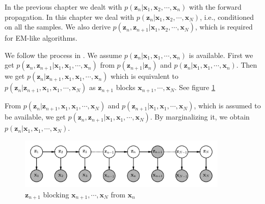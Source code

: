 \documentclass[a4]{article}
\begin{document}
In the previous chapter we dealt with $p(\bm{z}_n | \bm{x}_1, \bm{x}_2, \cdots, \bm{x}_n)$ with the forward propagation.
In this chapter we deal with $p(\bm{z}_n | \bm{x}_1, \bm{x}_2, \cdots, \bm{x}_N)$, i.e., conditioned on all the
samples. We also derive $p(\bm{z}_n, \bm{z}_{n+1} | \bm{x}_1, \bm{x}_2, \cdots, \bm{x}_N)$, which is required
for EM-like algorithms.

We follow the process in \cite{sarkka2011}. We assume $p(\bm{z}_n | \bm{x}_1, \bm{x}_1, \cdots, \bm{x}_n)$ is available.
First we get $p(\bm{z}_n, \bm{z}_{n+1} | \bm{x}_1, \bm{x}_1, \cdots, \bm{x}_n)$ from
$p(\bm{z}_{n+1} |\bm{z}_{n})$
and
$p(\bm{z}_n | \bm{x}_1, \bm{x}_1, \cdots, \bm{x}_n)$.
Then we get $p(\bm{z}_n | \bm{z}_{n+1},  \bm{x}_1, \bm{x}_1, \cdots, \bm{x}_n)$ which is equivalent to
$p(\bm{z}_n | \bm{z}_{n+1},  \bm{x}_1, \bm{x}_1, \cdots, \bm{x}_N)$ as $\bm{z}_{n+1}$ blocks
$\bm{x}_{n+1}, \cdots, \bm{x}_N$. See figure \ref{fig:chain_n_plus_1_block}

From $p(\bm{z}_n | \bm{z}_{n+1},  \bm{x}_1, \bm{x}_1, \cdots, \bm{x}_N)$ and 
$p(\bm{z}_{n+1} | \bm{x}_1, \bm{x}_1, \cdots, \bm{x}_N)$, which is assumed to be available, we get
$p(\bm{z}_n, \bm{z}_{n+1} | \bm{x}_1, \bm{x}_1, \cdots, \bm{x}_N)$. By marginalizing it, we obtain
$p(\bm{z}_n | \bm{x}_1, \bm{x}_1, \cdots, \bm{x}_N)$.

\begin{figure}[!htb]
\centering
\includegraphics[width=10cm]{chain_n_plus_1_block.png}
\caption{$\bm{z}_{n+1}$ blocking $\bm{x}_{n+1}, \cdots, \bm{x}_N$ from $\bm{x}_n$}
\label{fig:chain_n_plus_1_block}
\end{figure}
\end{document}
